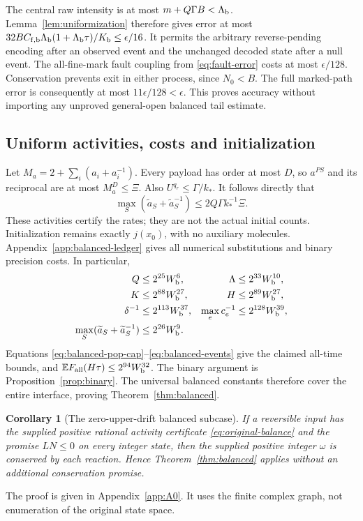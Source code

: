 \documentclass[11pt,reqno]{amsart}
\newtheorem{corollary}[theorem]{Corollary}
\theoremstyle{definition}
\theoremstyle{remark}
\newcommand{\E}{\mathbb E}
\begin{document}
The central raw intensity is at most $m+Q\Gamma B<\Lambda_{\rm b}$.
Lemma~\ref{lem:uniformization} therefore gives error at most
$32BC_{{\rm f},\rm b}\Lambda_{\rm b}(1+\Lambda_{\rm b}\tau)/K_{\rm b}
\le\epsilon/16$. It permits the arbitrary reverse-pending encoding after an
observed event and the unchanged decoded state after a null event.
The all-fine-mark fault coupling from \eqref{eq:fault-error} costs at most
$\epsilon/128$. Conservation prevents exit in either process, since
$N_0<B$. The full marked-path error is consequently at most
$11\epsilon/128<\epsilon$. This proves accuracy without importing any
unproved general-open balanced tail estimate.

\subsection{Uniform activities, costs and initialization}
Let $M_a=2+\sum_i(a_i+a_i^{-1})$. Every payload has order at most $D$, so
$a^{PS}$ and its reciprocal are at most $M_a^D\le\Xi$. Also
$U^{q_r}\le\Gamma/k_*$. It follows directly that
\begin{equation}\label{eq:activity-bound}
 \max_S(\widetilde a_S+\widetilde a_S^{-1})
 \le2Q\Gamma k_*^{-1}\Xi.
\end{equation}
These activities certify the rates; they are not the actual initial counts.
Initialization remains exactly $j(x_0)$, with no auxiliary molecules.
Appendix~\ref{app:balanced-ledger} gives all numerical substitutions and
binary precision costs. In particular,
\begin{align*}
 Q&\le2^{25}W_{\rm b}^{6},&\Lambda&\le2^{33}W_{\rm b}^{10},\\
 K&\le2^{88}W_{\rm b}^{27},&H&\le2^{89}W_{\rm b}^{27},\\
 \delta^{-1}&\le2^{113}W_{\rm b}^{37},&
 \max_e c_e^{-1}&\le2^{128}W_{\rm b}^{39},\\
 \max_S(\widetilde a_S+\widetilde a_S^{-1})&\le2^{26}W_{\rm b}^{9}.&&
\end{align*}
Equations \eqref{eq:balanced-pop-cap}--\eqref{eq:balanced-events} give the
claimed all-time bounds, and $\E F_{\rm all}(H\tau)\le2^{94}W_{\rm b}^{32}$.
The binary argument is Proposition~\ref{prop:binary}. The universal balanced
constants therefore cover the entire interface, proving
Theorem~\ref{thm:balanced}.

\begin{corollary}[The zero-upper-drift balanced subcase]\label{cor:A0}
If a reversible input has the supplied positive rational activity certificate
\eqref{eq:original-balance} and the promise $LN\le0$ on every integer state,
then the supplied positive integer $\omega$ is conserved by each reaction.
Hence Theorem~\ref{thm:balanced} applies without an additional conservation
promise.
\end{corollary}
The proof is given in Appendix~\ref{app:A0}. It uses the finite complex graph,
not enumeration of the original state space.
\end{document}
